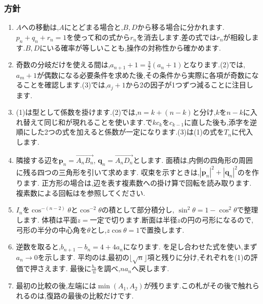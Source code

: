 \subsubsection{方針}\label{節：発展：方針}
\begin{enumerate}[label=\textbf{問\arabic*.},leftmargin=3.8em,format=\bookitemlink{practice-entrance}{hint}{answer}]
  \item $A$への移動は,$A$にとどまる場合と,$B,D$から移る場合に分かれます.$p_n+q_n+r_n=1$を使って和の式から$r_n$を消去します.差の式では$r_n$が相殺します.$B,D$にいる確率が等しいことも,操作の対称性から確かめます.
  \item 奇数の分岐だけを使える間は,$a_{n+1}+1=\frac32(a_n+1)$となります.(2)では,$a_m+1$が偶数になる必要条件を求めた後,その条件から実際に各項が奇数になることを確認します.(3)では,$a_j+1$から2の因子が1つずつ減ることに注目します.
  \item (1)は型として係数を掛けます.(2)では,$n=k+(n-k)$と分け,$k$を$n-k$に入れ替えて同じ和が現れることを使います.で$kc_k$を$c_{k-1}$に直した後も,添字を逆順にした2つの式を加えると係数が一定になります.(3)は(1)の式を$T_n$に代入します.
  \item 隣接する辺を$\boldsymbol p_n=\overrightarrow{A_nB_n}$,
    $\boldsymbol q_n=\overrightarrow{A_nD_n}$とします.
    面積は,内側の四角形の周囲に残る四つの三角形を引いて求めます.
    収束を示すときは,$|\boldsymbol p_n|^2+|\boldsymbol q_n|^2$のを作ります.
    正方形の場合は,辺を表す複素数への掛け算で回転を読み取ります.
    複素数による回転はを参照してください.
  \item $I_n$を$\cos^{-(n-2)}\theta$と$\cos^{-2}\theta$の積として部分積分し,
    $\sin^2\theta=1-\cos^2\theta$で整理します.
    体積は平面$z=$一定で切ります.断面は半径$z$の円の弓形になるので,
    弓形の半分の中心角を$\theta$とし,$z\cos\theta=1$で置換します.
  \item 逆数を取ると,$b_{n+1}-b_n=4+4a_n$になります.
    を足し合わせた式を使い,まず$a_n\to0$を示します.
    平均のは,最初の$\lfloor\sqrt n\rfloor$項と残りに分け,それぞれを(1)の評価で押さえます.
    最後に$\frac{b_n}{n}$を調べ,$na_n$へ戻します.
  \item 最初の比較の後,左端には$\min(A_1,A_2)$が残ります.この札がその後で触れられるのは,復路の最後の比較だけです.

\end{enumerate}
